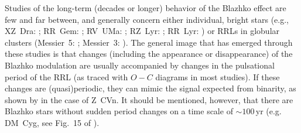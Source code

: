 \documentclass[twocolumn,times]{aastex63}
\begin{document}
Studies of the long-term (decades or longer) behavior of the Blazhko effect are few and far between, and generally concern
either individual, bright stars
(e.g., XZ~Dra: \citealt{2002A&A...396..539J}; RR~Gem: \citealt{2007A&A...469.1033S}; RV~UMa: \citealt{2007AN....328..841H};
RZ~Lyr: \citealt{2012MNRAS.423..993J}; RR~Lyr: \citealt{2014MNRAS.441.1435L})
or RRLs in globular clusters (Messier~5: \citealt{2011MNRAS.411.1763J}; Messier~3: \citealt{2012MNRAS.419.2173J}).
The general image that has emerged through these studies is that changes (including the appearance or disappearance) of
the Blazhko modulation are usually accompanied by changes in the pulsational period of the RRL (as traced with $O-C$ diagrams in most studies).
If these changes are (quasi)periodic, they can mimic the signal expected from binarity, as shown by \citet{2018MNRAS.474..824S} in the case of Z~CVn.
It should be mentioned, however, that there are Blazhko stars without sudden period changes on a time scale of $\sim 100$\,yr
(e.g. DM~Cyg, see Fig.~15 of \citealt{2009MNRAS.397..350J}).
\end{document}
